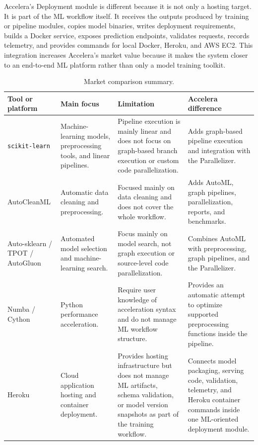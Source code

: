 \documentclass[12pt,a4paper]{report}
\newcommand{\acceleraTableStyle}{%
\small
\renewcommand{\arraystretch}{1.15}
\setlength{\tabcolsep}{4pt}%
}
\begin{document}
Accelera's Deployment module is different because it is not only a hosting
target. It is part of the ML workflow itself. It receives the outputs produced
by training or pipeline modules, copies model binaries, writes deployment
requirements, builds a Docker service, exposes prediction endpoints, validates
requests, records telemetry, and provides commands for local Docker, Heroku,
and AWS EC2. This integration increases Accelera's market value because it
makes the system closer to an end-to-end ML platform rather than only a model
training toolkit.


\begin{table}[!htbp]
\centering
\acceleraTableStyle
\scriptsize
\renewcommand{\arraystretch}{1.08}
\caption{Market comparison summary.}
\label{tab:market-comparison}
\begin{tabular}{p{}p{}p{}p{}}
\toprule
\textbf{Tool or platform} & \textbf{Main focus} & \textbf{Limitation} & \textbf{Accelera difference} \\
\midrule

\texttt{scikit-learn} &
Machine-learning models, preprocessing tools, and linear pipelines. &
Pipeline execution is mainly linear and does not focus on graph-based branch
execution or custom code parallelization. &
Adds graph-based pipeline execution and integration with the Parallelizer. \\
\midrule

AutoCleanML &
Automatic data cleaning and preprocessing. &
Focused mainly on data cleaning and does not cover the whole workflow. &
Adds AutoML, graph pipelines, parallelization, reports, and benchmarks. \\
\midrule

Auto-sklearn / TPOT / AutoGluon &
Automated model selection and machine-learning search. &
Focus mainly on model search, not graph execution or source-level code
parallelization. &
Combines AutoML with preprocessing, graph pipelines, and the Parallelizer. \\
\midrule

Numba / Cython &
Python performance acceleration. &
Require user knowledge of acceleration syntax and do not manage ML workflow
structure. &
Provides an automatic attempt to optimize supported preprocessing functions
inside the pipeline. \\
\midrule

Heroku &
Cloud application hosting and container deployment. &
Provides hosting infrastructure but does not manage ML artifacts, schema
validation, or model version snapshots as part of the training workflow. &
Connects model packaging, serving code, validation, telemetry, and Heroku
container commands inside one ML-oriented deployment module. \\
\midrule


\end{tabular}
\end{table}
\end{document}
